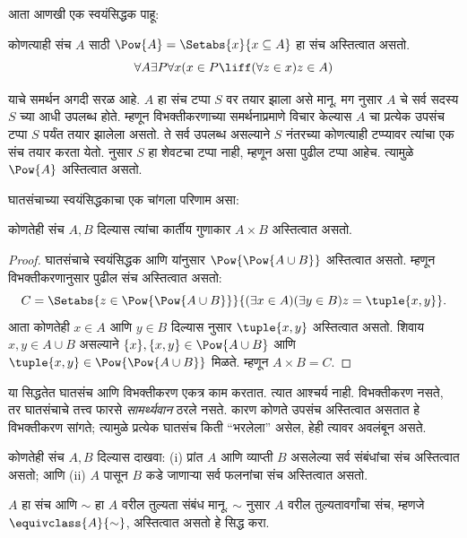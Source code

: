 \documentclass[../../../include/open-logic-section]{subfiles}
\begin{document}

आता आणखी एक स्वयंसिद्धक पाहू:

\begin{axiom}[घातसंच]
कोणत्याही संच $A$ साठी $\Pow{A} = \Setabs{x}{x \subseteq A}$ हा संच अस्तित्वात असतो.
\[
	\forall A \exists P \forall x(x \in P \liff (\forall z \in x)z \in A)
\]
\end{axiom}

याचे समर्थन अगदी सरळ आहे. $A$ हा संच टप्पा $S$ वर तयार झाला असे मानू. मग \stagesacc{} नुसार $A$ चे सर्व सदस्य $S$ च्या आधी उपलब्ध होते. म्हणून विभक्तीकरणाच्या समर्थनाप्रमाणे विचार केल्यास $A$ चा प्रत्येक उपसंच टप्पा $S$ पर्यंत तयार झालेला असतो. ते सर्व उपलब्ध असल्याने $S$ नंतरच्या कोणत्याही टप्प्यावर त्यांचा एक संच तयार करता येतो. \stagessucc{} नुसार $S$ हा शेवटचा टप्पा नाही, म्हणून असा पुढील टप्पा आहेच. त्यामुळे $\Pow{A}$ अस्तित्वात असतो.

घातसंचाच्या स्वयंसिद्धकाचा एक चांगला परिणाम असा:

\begin{prop}\label{thm:Products}
कोणतेही संच $A, B$ दिल्यास त्यांचा कार्तीय गुणाकार $A \times B$ अस्तित्वात असतो.
\end{prop}

\begin{proof}
घातसंचाचे स्वयंसिद्धक आणि  यांनुसार $\Pow{\Pow{A \cup B}}$ अस्तित्वात असतो. म्हणून विभक्तीकरणानुसार पुढील संच अस्तित्वात असतो:
\[
	C = \Setabs{z \in \Pow{\Pow{A \cup B}}}{(\exists x \in A)(\exists y \in B) z = \tuple{x, y}}.
\]
आता कोणतेही $x \in A$ आणि $y \in B$ दिल्यास  नुसार $\tuple{x, y}$ अस्तित्वात असतो. शिवाय $x, y
\in A \cup B$ असल्याने $\{x\}, \{x, y\} \in \Pow{A \cup B}$ आणि $\tuple{x,y} \in \Pow{\Pow{A \cup B}}$ मिळते. म्हणून $A \times B = C$.
\end{proof}

या सिद्धतेत घातसंच आणि विभक्तीकरण एकत्र काम करतात. त्यात आश्चर्य नाही. विभक्तीकरण नसते, तर घातसंचाचे तत्त्व फारसे \emph{सामर्थ्यवान} ठरले नसते. कारण कोणते उपसंच अस्तित्वात असतात हे विभक्तीकरण सांगते; त्यामुळे प्रत्येक घातसंच किती ``भरलेला'' असेल, हेही त्यावर अवलंबून असते.

\begin{prob}
कोणतेही संच $A, B$ दिल्यास दाखवा: (i) प्रांत $A$ आणि व्याप्ती $B$ असलेल्या सर्व संबंधांचा संच अस्तित्वात असतो; आणि (ii) $A$ पासून $B$ कडे जाणाऱ्या सर्व फलनांचा संच अस्तित्वात असतो.
\end{prob}

\begin{prob}
$A$ हा संच आणि $\sim$ हा $A$ वरील तुल्यता संबंध मानू. $\sim$ नुसार $A$ वरील तुल्यतावर्गांचा संच, म्हणजे $\equivclass{A}{\sim}$, अस्तित्वात असतो हे सिद्ध करा.
\end{prob}
\end{document}
